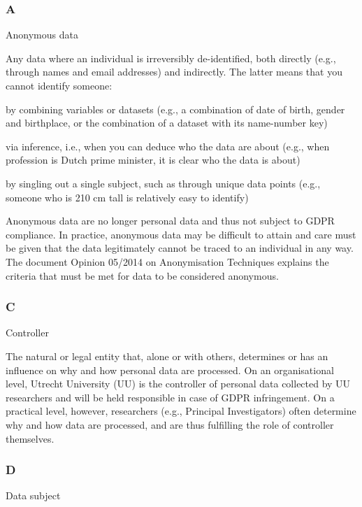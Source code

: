 \documentclass[
]{book}
\begin{document}
\hypertarget{a}{%
\subsubsection{A}\label{a}}

Anonymous data

Any data where an individual is irreversibly de-identified, both directly (e.g., through names and email addresses) and indirectly. The latter means that you cannot identify someone:

by combining variables or datasets (e.g., a combination of date of birth, gender and birthplace, or the combination of a dataset with its name-number key)

via inference, i.e., when you can deduce who the data are about (e.g., when profession is Dutch prime minister, it is clear who the data is about)

by singling out a single subject, such as through unique data points (e.g., someone who is 210 cm tall is relatively easy to identify)

Anonymous data are no longer personal data and thus not subject to GDPR compliance. In practice, anonymous data may be difficult
to attain and care must be given that the data legitimately cannot be traced to an individual in any way. The document
Opinion 05/2014 on Anonymisation Techniques
explains the criteria that must be met for data to be considered anonymous.

\hypertarget{c}{%
\subsubsection{C}\label{c}}

Controller

The natural or legal entity that, alone or with others, determines or has an influence on why and how
personal data are processed. On an organisational level, Utrecht University (UU) is the controller of personal data
collected by UU researchers and will be held responsible in case of GDPR infringement. On a practical level, however,
researchers (e.g., Principal Investigators) often determine why and how data are processed, and are thus fulfilling the
role of controller themselves.

\hypertarget{d}{%
\subsubsection{D}\label{d}}

Data subject
\end{document}
